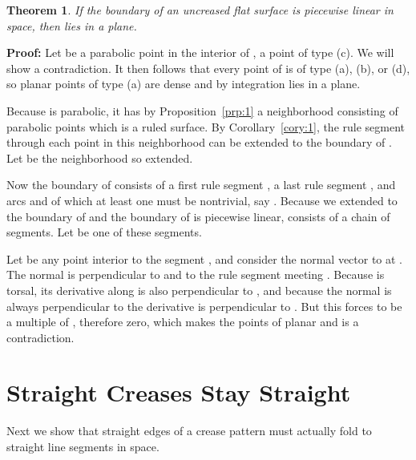 \documentclass[11pt,letterpaper]{article}
\newtheorem{theorem}{Theorem}
\newenvironment{proof}{\noindent\textbf{Proof: }\ignorespaces}
  {\hspace*{\fill}\medskip}
\begin{document}
\begin{theorem}\label{thm:5}
  If the boundary of an uncreased flat surface  is piecewise
  linear in space, then  lies in a plane.
\end{theorem}
\begin{proof}
  Let  be a parabolic point in the interior of , a point of type (c).  We will
  show a contradiction.  It then follows that every point of  is of
  type (a), (b), or (d), so planar points of type (a) are dense and by
  integration  lies in a plane.

  Because  is parabolic, it has by Proposition~\ref{prp:1} a
  neighborhood consisting of parabolic points which is a ruled
  surface.  By Corollary~\ref{cory:1},
  the rule segment through each point in this neighborhood can be
  extended to the boundary of .  Let  be the neighborhood so
  extended.

  Now the boundary of  consists of a first rule segment , a last
  rule segment , and arcs  and  of which at least one must be
  nontrivial, say .  Because we extended  to the boundary of
   and the boundary of  is piecewise linear,  consists of a
  chain of segments.  Let  be one of these segments.

  Let  be any point interior to the segment , and consider
  the normal vector  to  at .  The normal is perpendicular
  to  and to the rule segment  meeting .  Because  is
  torsal, its derivative  along  is also perpendicular to
  , and because the normal is always perpendicular to  the
  derivative is perpendicular to .  But this forces  to
  be a multiple of , therefore zero, which makes the points of
   planar and is a contradiction.
\end{proof}



\section{Straight Creases Stay Straight}

Next we show that straight edges of a crease pattern
must actually fold to straight line segments in space.
\end{document}
